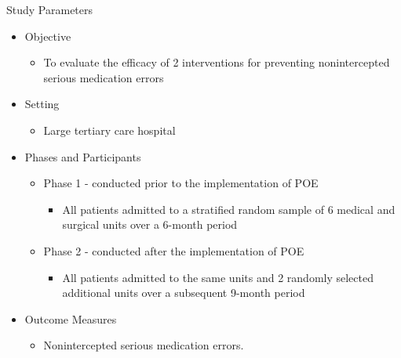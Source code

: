 \documentclass[10pt]{beamer}
\begin{document}
\begin{frame}{Study Parameters}
	\begin{itemize}
		\item Objective
		\begin{itemize}
			\item To evaluate the efficacy of 2 interventions for preventing nonintercepted serious medication errors
		\end{itemize}
		\item Setting
		\begin{itemize}
			\item Large tertiary care hospital
		\end{itemize}
		\item Phases and Participants
		\begin{itemize}
			\item Phase 1 - conducted prior to the implementation of POE
			\begin{itemize}
				\item All patients admitted to a stratified random sample of 6 medical and surgical units over a 6-month period
			\end{itemize}
			\item Phase 2 - conducted after the implementation of POE
			\begin{itemize}
				\item All patients admitted to the same units and 2 randomly selected additional units over a subsequent 9-month period
			\end{itemize}
		\end{itemize}
		\item Outcome Measures
		\begin{itemize}
			\item Nonintercepted serious medication errors.
		\end{itemize}
	\end{itemize}
\end{frame}
\end{document}
